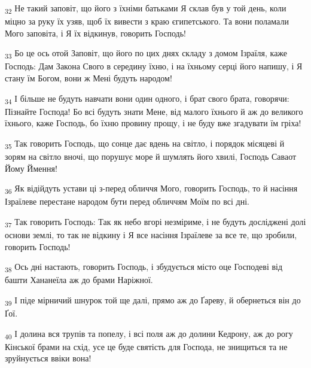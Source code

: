 \begin{tcolorbox}
\textsubscript{32} Не такий заповіт, що його з їхніми батьками Я склав був у той день, коли міцно за руку їх узяв, щоб їх вивести з краю єгипетського. Та вони поламали Мого заповіта, і Я їх відкинув, говорить Господь!
\end{tcolorbox}
\begin{tcolorbox}
\textsubscript{33} Бо це ось отой Заповіт, що його по цих днях складу з домом Ізраїля, каже Господь: Дам Закона Свого в середину їхню, і на їхньому серці його напишу, і Я стану їм Богом, вони ж Мені будуть народом!
\end{tcolorbox}
\begin{tcolorbox}
\textsubscript{34} І більше не будуть навчати вони один одного, і брат свого брата, говорячи: Пізнайте Господа! Бо всі будуть знати Мене, від малого їхнього й аж до великого їхнього, каже Господь, бо їхню провину прощу, і не буду вже згадувати їм гріха!
\end{tcolorbox}
\begin{tcolorbox}
\textsubscript{35} Так говорить Господь, що сонце дає вдень на світло, і порядок місяцеві й зорям на світло вночі, що порушує море й шумлять його хвилі, Господь Саваот Йому Ймення!
\end{tcolorbox}
\begin{tcolorbox}
\textsubscript{36} Як відійдуть устави ці з-перед обличчя Мого, говорить Господь, то й насіння Ізраїлеве перестане народом бути перед обличчям Моїм по всі дні.
\end{tcolorbox}
\begin{tcolorbox}
\textsubscript{37} Так говорить Господь: Так як небо вгорі незміриме, і не будуть досліджені долі основи землі, то так не відкину і Я все насіння Ізраїлеве за все те, що зробили, говорить Господь!
\end{tcolorbox}
\begin{tcolorbox}
\textsubscript{38} Ось дні настають, говорить Господь, і збудується місто оце Господеві від башти Хананеїла аж до брами Наріжної.
\end{tcolorbox}
\begin{tcolorbox}
\textsubscript{39} І піде мірничий шнурок той ще далі, прямо аж до Ґареву, й обернеться він до Ґої.
\end{tcolorbox}
\begin{tcolorbox}
\textsubscript{40} І долина вся трупів та попелу, і всі поля аж до долини Кедрону, аж до рогу Кінської брами на схід, усе це буде святість для Господа, не знищиться та не зруйнується ввіки вона!
\end{tcolorbox}
